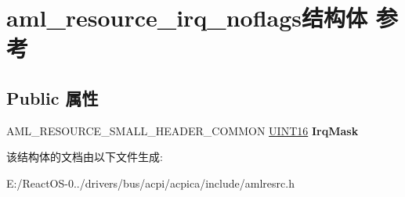 \hypertarget{structaml__resource__irq__noflags}{}\section{aml\+\_\+resource\+\_\+irq\+\_\+noflags结构体 参考}
\label{structaml__resource__irq__noflags}
\subsection*{Public 属性}
\begin{DoxyCompactItemize}
\item 
\mbox{\label{structaml__resource__irq__noflags_a4f22901c6136ae20cd198a0e99656c8b}} 
A\+M\+L\+\_\+\+R\+E\+S\+O\+U\+R\+C\+E\+\_\+\+S\+M\+A\+L\+L\+\_\+\+H\+E\+A\+D\+E\+R\+\_\+\+C\+O\+M\+M\+ON \hyperlink{_processor_bind_8h_a09f1a1fb2293e33483cc8d44aefb1eb1}{U\+I\+N\+T16} {\bfseries Irq\+Mask}
\end{DoxyCompactItemize}


该结构体的文档由以下文件生成\+:\begin{DoxyCompactItemize}
\item 
E\+:/\+React\+O\+S-\/0../drivers/bus/acpi/acpica/include/amlresrc.\+h\end{DoxyCompactItemize}
